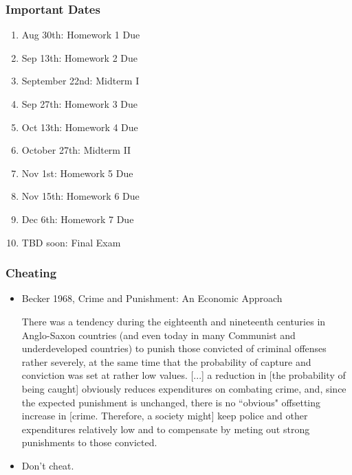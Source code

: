 \documentclass{beamer}
\begin{document}
\begin{frame}
\frametitle[alignment=center]{Important Dates}
\begin{enumerate}
\item Aug 30th:  Homework 1 Due
\item Sep 13th:  Homework 2 Due
\item September 22nd:  Midterm I
\item Sep 27th:  Homework 3 Due
\item Oct 13th:  Homework 4 Due
\item October 27th:  Midterm II 
\item Nov 1st:  Homework 5 Due
\item Nov 15th:  Homework 6 Due
\item Dec 6th:  Homework 7 Due
\item TBD soon:  Final Exam
\end{enumerate}
\end{frame}

\begin{frame}
\frametitle[alignment=center]{Cheating}
\begin{itemize}
\item Becker 1968, Crime and Punishment: An Economic Approach
\begin{displayquote}
There was a tendency during the eighteenth and nineteenth centuries in Anglo-Saxon countries (and even today in many Communist and underdeveloped countries) to punish those convicted of criminal offenses rather severely, at the same time that the probability of capture and conviction was set at rather low values.  [...]  a reduction in [the probability of being caught] obviously reduces expenditures on combating crime, and, since the expected punishment is unchanged, there is no ``obvious" offsetting increase in [crime.  Therefore, a society might] keep police and other expenditures relatively low and to compensate by meting out strong punishments to those convicted.
\end{displayquote}
\item Don't cheat.  
\end{itemize}
\end{frame}
\end{document}
